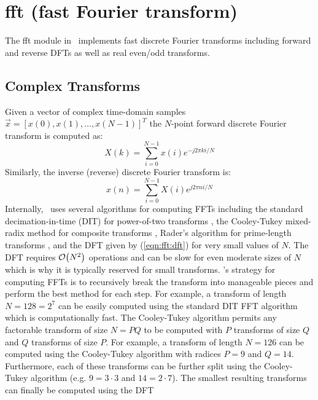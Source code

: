 % 
%

\newpage
\section{fft (fast Fourier transform)}
\label{module:fft}
%
The fft module in \liquid\ implements fast discrete Fourier transforms
including forward and reverse DFTs as well as real even/odd transforms.

\subsection{Complex Transforms}
\label{module:fft:dft}
Given a vector of complex time-domain samples
$\vec{x} = \left[x(0),x(1),\ldots,x(N-1)\right]^T$
the $N$-point forward discrete Fourier transform is computed as:
%
\begin{equation}
\label{eqn:fft:dft}
    X(k) = \sum_{i=0}^{N-1}{x(i) e^{-j 2 \pi k i/N}}
\end{equation}
%
Similarly, the inverse (reverse) discrete Fourier transform is:
\begin{equation}
\label{eqn:fft:idft}
    x(n) = \sum_{i=0}^{N-1}{X(i) e^{ j 2 \pi n i/N}}
\end{equation}
%
Internally, \liquid\ uses several algorithms for computing FFTs including
the standard decimation-in-time (DIT) for power-of-two transforms
    \cite[\S10-4]{Ziemer:1998},
the Cooley-Tukey mixed-radix method for composite transforms
    \cite{CooleyTukey:1965},
Rader's algorithm for prime-length transforms \cite{Rader:1968},
and the DFT given by (\ref{eqn:fft:dft}) for very small values of $N$.
The DFT requires $\mathcal{O}\bigl(N^2\bigr)$ operations
and can be slow for even moderate sizes of $N$
which is why it is typically reserved for small transforms.
\liquid's strategy for computing FFTs is to recursively break the
transform into manageable pieces and perform the best method for each
step.
For example, a transform of length $N=128=2^7$ can be easily computed
using the standard DIT FFT algorithm which is computationally fast.
The Cooley-Tukey algorithm permits any factorable transform of size
$N=PQ$ to be computed with
$P$ transforms of size $Q$ and $Q$ transforms of size $P$.
For example, a transform of length $N=126$ can be computed using the
Cooley-Tukey algorithm with radices $P=9$ and $Q=14$.
Furthermore, each of these transforms can be further split using the
Cooley-Tukey algorithm (e.g. $9=3\cdot3$ and $14=2\cdot7$).
The smallest resulting transforms can finally be computed using the DFT

